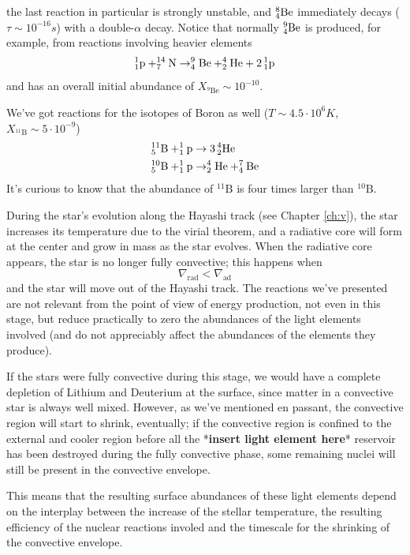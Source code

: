 the last reaction in particular is strongly unstable, and $\element{Be}{8}{4}$ immediately decays ($\tau \sim 10^{-16}\unit{s}$) with a double-$\alpha$ decay. Notice that normally $\element{Be}{9}{4}$ is produced, for example, from reactions involving heavier elements
\begin{equation*}
    \element{p}{1}{1}+\element{N}{14}{7}\to \element{Be}{9}{4}+\element{He}{4}{2}+2\,\element{p}{1}{1}
\end{equation*}
and has an overall initial abundance of $X_{^{9}\text{Be}}\sim 10^{-10}$.
\par We've got reactions for the isotopes of Boron as well ($T\sim 4.5\cdot 10^{6}\unit{K}$, $X_{^{11}\text{B}}\sim 5\cdot 10^{-9}$)
\begin{align*}
    \element{B}{11}{5}+\element{p}{1}{1}&\to 3\,\element{He}{4}{2}\\
    \element{B}{10}{5}+\element{p}{1}{1}&\to \element{He}{4}{2}+\element{Be}{7}{4}
\end{align*}
It's curious to know that the abundance of $^{11}\text{B}$ is four times larger than $^{10}\text{B}$.
\par During the star's evolution along the Hayashi track (see Chapter \ref{ch:v}), the star increases its temperature due to the virial theorem, and a radiative core will form at the center and grow in mass as the star evolves. When the radiative core appears, the star is no longer fully convective; this happens when 
\begin{equation*}
    \nabla_{\text{rad}}<\nabla_{\text{ad}}
\end{equation*}
and the star will move out of the Hayashi track. The reactions we've presented are not relevant from the point of view of energy production, not even in this stage, but reduce practically to zero the abundances of the light elements involved (and do not appreciably affect the abundances of the elements they produce).
\par If the stars were fully convective during this stage, we would have a complete depletion of Lithium and Deuterium at the surface, since matter in a convective star is always well mixed. However, as we've mentioned en passant, the convective region will start to shrink, eventually; if the convective region is confined to the external and cooler region before all the *\textbf{insert light element here}* reservoir has been destroyed during the fully convective phase, some remaining nuclei will still be present in the convective envelope.
\par This means that the resulting surface abundances of these light elements depend on the interplay between the increase of the stellar temperature, the resulting efficiency of the nuclear reactions involed and the timescale for the shrinking of the convective envelope.
